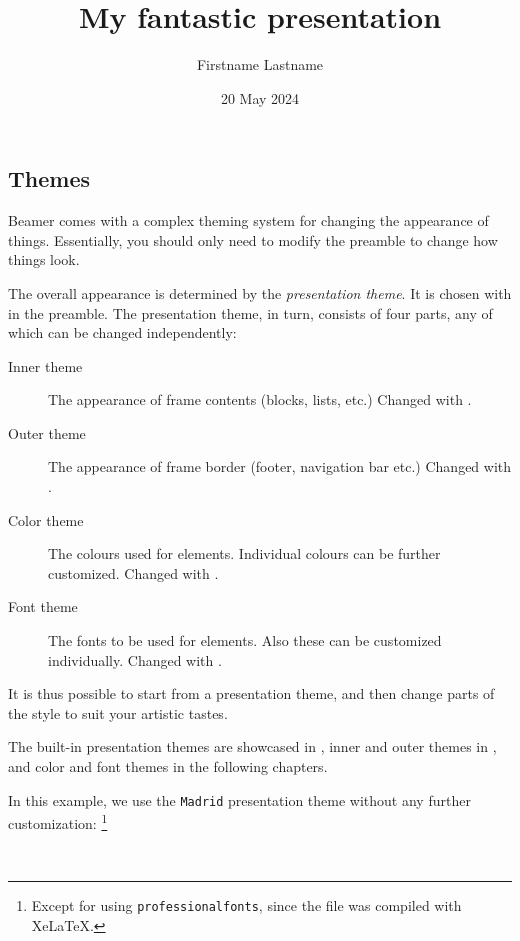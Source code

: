 %
%
\subsection{Themes}

Beamer comes with a complex theming system for changing the appearance of things.
Essentially, you should only need to modify the preamble to change how things look.

The overall appearance is determined by the \emph{presentation theme}.
It is chosen with  in the preamble.
The presentation theme, in turn, consists of four parts, any of which can be changed independently:
\begin{description}
\item[Inner theme] The appearance of frame contents (blocks, lists, etc.)
    Changed with .
\item[Outer theme] The appearance of frame border (footer, navigation bar etc.)
    Changed with .
\item[Color theme] The colours used for elements.
    Individual colours can be further customized.
    Changed with .
\item[Font theme] The fonts to be used for elements.
    Also these can be customized individually.
    Changed with .
\end{description}
%
It is thus possible to start from a presentation theme,
and then change parts of the style to suit your artistic tastes.

The built-in presentation themes are showcased in \cite[Chapter~15]{beamer},
inner and outer themes in \cite[Chapter~16]{beamer},
and color and font themes in the following chapters.

In this example, we use the \verb|Madrid| presentation theme without any further customization:%
\footnote{Except for using \texttt{professionalfonts}, since the file was compiled with XeLaTeX.}
%
\begin{ExampleCode}
\title{My fantastic presentation}
\author[F.~Lastname]{Firstname Lastname}
\date{20 May 2024}

\beamertemplatenavigationsymbolsempty
{}
\end{ExampleCode}
%
\begin{center}
~
\end{center}

